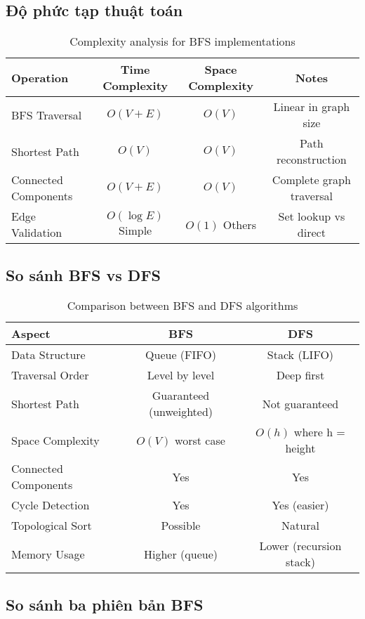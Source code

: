\documentclass[12pt]{article}
\begin{document}
\subsection*{Độ phức tạp thuật toán}

\begin{table}[H]
\centering
\footnotesize
\begin{tabular}{|l|c|c|c|}
\hline
\textbf{Operation} & \textbf{Time Complexity} & \textbf{Space Complexity} & \textbf{Notes} \\
\hline
BFS Traversal & $O(V + E)$ & $O(V)$ & Linear in graph size \\
Shortest Path & $O(V)$ & $O(V)$ & Path reconstruction \\
Connected Components & $O(V + E)$ & $O(V)$ & Complete graph traversal \\
Edge Validation & $O(\log E)$ Simple & $O(1)$ Others & Set lookup vs direct \\
\hline
\end{tabular}
\caption{Complexity analysis for BFS implementations}
\end{table}

\subsection*{So sánh BFS vs DFS}

\begin{table}[H]
\centering
\footnotesize
\begin{tabular}{|l|c|c|}
\hline
\textbf{Aspect} & \textbf{BFS} & \textbf{DFS} \\
\hline
Data Structure & Queue (FIFO) & Stack (LIFO) \\
Traversal Order & Level by level & Deep first \\
Shortest Path & Guaranteed (unweighted) & Not guaranteed \\
Space Complexity & $O(V)$ worst case & $O(h)$ where h = height \\
Connected Components & Yes & Yes \\
Cycle Detection & Yes & Yes (easier) \\
Topological Sort & Possible & Natural \\
Memory Usage & Higher (queue) & Lower (recursion stack) \\
\hline
\end{tabular}
\caption{Comparison between BFS and DFS algorithms}
\end{table}

\subsection*{So sánh ba phiên bản BFS}
\end{document}
